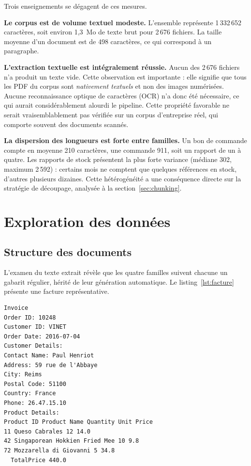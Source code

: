 Trois enseignements se dégagent de ces mesures.

\textbf{Le corpus est de volume textuel modeste.} L'ensemble représente
1\,332\,652 caractères, soit environ 1,3~Mo de texte brut pour 2\,676 fichiers.
La taille moyenne d'un document est de 498 caractères, ce qui correspond à un
paragraphe.

\textbf{L'extraction textuelle est intégralement réussie.} Aucun des 2\,676
fichiers n'a produit un texte vide. Cette observation est importante : elle
signifie que tous les PDF du corpus sont \emph{nativement textuels} et non des
images numérisées. Aucune reconnaissance optique de caractères (OCR) n'a donc
été nécessaire, ce qui aurait considérablement alourdi le pipeline. Cette
propriété favorable ne serait vraisemblablement pas vérifiée sur un corpus
d'entreprise réel, qui comporte souvent des documents scannés.

\textbf{La dispersion des longueurs est forte entre familles.} Un bon de
commande compte en moyenne 210 caractères, une commande 911, soit un rapport de
un à quatre. Les rapports de stock présentent la plus forte variance
(médiane 302, maximum 2\,592) : certains mois ne comptent que quelques
références en stock, d'autres plusieurs dizaines. Cette hétérogénéité a une
conséquence directe sur la stratégie de découpage, analysée à la
section~\ref{sec:chunking}.

\section{Exploration des données}

\subsection{Structure des documents}

L'examen du texte extrait révèle que les quatre familles suivent chacune un
gabarit régulier, hérité de leur génération automatique. Le
listing~\ref{lst:facture} présente une facture représentative.

\begin{lstlisting}[style=plain,caption={Texte extrait d'une facture (\texttt{invoice\_10248.pdf})},label={lst:facture}]
Invoice
Order ID: 10248
Customer ID: VINET
Order Date: 2016-07-04
Customer Details:
Contact Name: Paul Henriot
Address: 59 rue de l'Abbaye
City: Reims
Postal Code: 51100
Country: France
Phone: 26.47.15.10
Product Details:
Product ID Product Name Quantity Unit Price
11 Queso Cabrales 12 14.0
42 Singaporean Hokkien Fried Mee 10 9.8
72 Mozzarella di Giovanni 5 34.8
  TotalPrice 440.0
\end{lstlisting}

